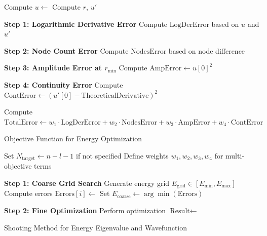 \begin{algorithm}[H]
    \SetAlgoLined
    
    Compute $u \gets$  
    Compute $r$, $u'$ 
    
    \BlankLine
    \textbf{Step 1: Logarithmic Derivative Error} 
    Compute $\text{LogDerError}$ based on $u$ and $u'$ 
    
    \BlankLine
    \textbf{Step 2: Node Count Error} 
    Compute $\text{NodesError}$ based on node difference\;
    
    \BlankLine
    \textbf{Step 3: Amplitude Error at $r_{\min}$}\;
    Compute $\text{AmpError} \gets u[0]^2$\;
    
    \BlankLine
    \textbf{Step 4: Continuity Error}\;
    Compute $\text{ContError} \gets (u'[0] - \text{TheoreticalDerivative})^2$\;
    
    Compute $\text{TotalError} \gets w_1 \cdot \text{LogDerError} + w_2 \cdot \text{NodesError} + w_3 \cdot \text{AmpError} + w_4 \cdot \text{ContError}$\;
    
    \caption{Objective Function for Energy Optimization}
\end{algorithm}
\begin{algorithm}[H]
    \SetAlgoLined
    
    Set $N_{\text{target}} \gets n - l - 1$ if not specified\;
    Define weights $w_1, w_2, w_3, w_4$ for multi-objective terms\;
    
    \BlankLine
    \textbf{Step 1: Coarse Grid Search}\;
    Generate energy grid $E_{\text{grid}} \in [E_{\min}, E_{\max}]$\;
    Compute errors $\text{Errors}[i] \gets$ \;
    Set $E_{\text{coarse}} \gets \arg\min(\text{Errors})$\;
    
    \BlankLine
    \textbf{Step 2: Fine Optimization}\;
    Perform optimization $\text{Result} \gets$ \;
    
    
    \caption{Shooting Method for Energy Eigenvalue and Wavefunction}
\end{algorithm}
